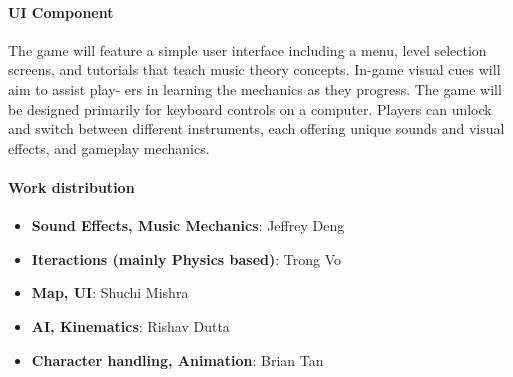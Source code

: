 \documentclass[11pt]{article}
\begin{document}
\paragraph*{UI Component}
The game will feature a simple user interface including a menu, level selection
screens, and tutorials that teach music theory concepts. In-game visual cues will aim to assist play-
ers in learning the mechanics as they progress. The game will be designed primarily for keyboard
controls on a computer. Players can unlock and switch between different instruments, each offering
unique sounds and visual effects, and gameplay mechanics.


\paragraph*{Work distribution}
\begin{itemize}
    
    \item \textbf{Sound Effects, Music Mechanics}: Jeffrey Deng
    \item \textbf{Iteractions (mainly Physics based)}: Trong Vo
    \item \textbf{Map, UI}: Shuchi Mishra
    \item \textbf{AI, Kinematics}: Rishav Dutta
    \item \textbf{Character handling, Animation}: Brian Tan

\end{itemize}
\end{document}
